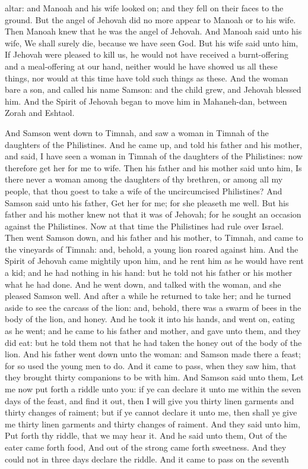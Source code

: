 altar: and Manoah and his wife looked on; and they fell on their faces to the ground.  But the angel of Jehovah did no more appear to Manoah or to his wife. Then Manoah knew that he was the angel of Jehovah. And Manoah said unto his wife, We shall surely die, because we have seen God. But his wife said unto him, If Jehovah were pleased to kill us, he would not have received a burnt-offering and a meal-offering at our hand, neither would he have showed us all these things, nor would at this time have told such things as these. And the woman bare a son, and called his name Samson: and the child grew, and Jehovah blessed him. And the Spirit of Jehovah began to move him in Mahaneh-dan, between Zorah and Eshtaol. 

And Samson went down to Timnah, and saw a woman in Timnah of the daughters of the Philistines. And he came up, and told his father and his mother, and said, I have seen a woman in Timnah of the daughters of the Philistines: now therefore get her for me to wife. Then his father and his mother said unto him, Is there never a woman among the daughters of thy brethren, or among all my people, that thou goest to take a wife of the uncircumcised Philistines? And Samson said unto his father, Get her for me; for she pleaseth me well. But his father and his mother knew not that it was of Jehovah; for he sought an occasion against the Philistines. Now at that time the Philistines had rule over Israel.  Then went Samson down, and his father and his mother, to Timnah, and came to the vineyards of Timnah: and, behold, a young lion roared against him. And the Spirit of Jehovah came mightily upon him, and he rent him as he would have rent a kid; and he had nothing in his hand: but he told not his father or his mother what he had done. And he went down, and talked with the woman, and she pleased Samson well. And after a while he returned to take her; and he turned aside to see the carcass of the lion: and, behold, there was a swarm of bees in the body of the lion, and honey. And he took it into his hands, and went on, eating as he went; and he came to his father and mother, and gave unto them, and they did eat: but he told them not that he had taken the honey out of the body of the lion.  And his father went down unto the woman: and Samson made there a feast; for so used the young men to do. And it came to pass, when they saw him, that they brought thirty companions to be with him. And Samson said unto them, Let me now put forth a riddle unto you: if ye can declare it unto me within the seven days of the feast, and find it out, then I will give you thirty linen garments and thirty changes of raiment; but if ye cannot declare it unto me, then shall ye give me thirty linen garments and thirty changes of raiment. And they said unto him, Put forth thy riddle, that we may hear it. And he said unto them, Out of the eater came forth food, And out of the strong came forth sweetness. And they could not in three days declare the riddle.  And it came to pass on the seventh 